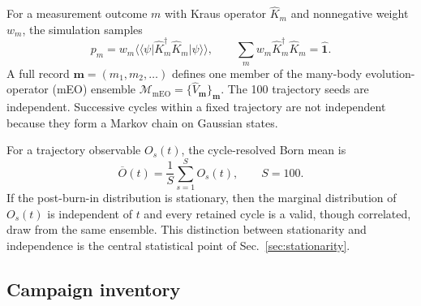 \documentclass[aps,prb,twocolumn,nofootinbib,superscriptaddress,floatfix]{revtex4-2}
\begin{document}
For a measurement outcome $m$ with Kraus operator $\hat K_m$ and nonnegative
weight $w_m$, the simulation samples
\begin{equation}
 p_m=w_m\langle\!\langle\psi\rvert
 \hat K_m^\dagger\hat K_m
 \lvert\psi\rangle\!\rangle,
 \qquad
 \sum_m w_m\hat K_m^\dagger\hat K_m=\hat{\mathbf{1}}.
 \label{eq:born}
\end{equation}
A full record $\boldsymbol m=(m_1,m_2,\ldots)$ defines one member of the
many-body evolution-operator (mEO) ensemble
$\mathcal M_{\mathrm{mEO}}=\{\hat V_{\boldsymbol m}\}_{\boldsymbol m}$.
The 100 trajectory seeds are independent.  Successive cycles within a fixed
trajectory are not independent because they form a Markov chain on Gaussian
states.

For a trajectory observable $O_s(t)$, the cycle-resolved Born mean is
\begin{equation}
 \overline O(t)=\frac1S\sum_{s=1}^{S}O_s(t),\qquad S=100.
 \label{eq:bornmean}
\end{equation}
If the post-burn-in distribution is stationary, then the marginal
distribution of $O_s(t)$ is independent of $t$ and every retained cycle is a
valid, though correlated, draw from the same ensemble.  This distinction
between stationarity and independence is the central statistical point of
Sec.~\ref{sec:stationarity}.

\subsection{Campaign inventory}
\end{document}
